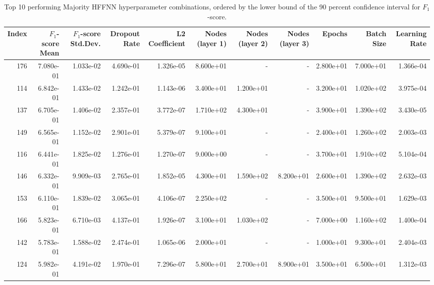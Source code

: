 \begin{table}
\caption{Top 10 performing Majority HFFNN hyperparameter combinations, ordered by the lower bound of the 90 percent confidence interval for $F_1$-score.}
\label{tab:05_best_majority_hffnn_hpars}
\begin{tabular}{rrrrrrrrrrr}
\toprule
Index & $F_1$-score Mean & $F_1$-score Std.Dev. & Dropout Rate & L2 Coefficient & Nodes (layer 1) & Nodes (layer 2) & Nodes (layer 3) & Epochs & Batch Size & Learning Rate \\
\midrule
176 & 7.080e-01 & 1.033e-02 & 4.690e-01 & 1.326e-05 & 8.600e+01 & - & - & 2.800e+01 & 7.000e+01 & 1.366e-04 \\
114 & 6.842e-01 & 1.433e-02 & 1.242e-01 & 1.143e-06 & 3.400e+01 & 1.200e+01 & - & 3.200e+01 & 1.020e+02 & 3.975e-04 \\
137 & 6.705e-01 & 1.406e-02 & 2.357e-01 & 3.772e-07 & 1.710e+02 & 4.300e+01 & - & 3.900e+01 & 1.390e+02 & 3.430e-05 \\
149 & 6.565e-01 & 1.152e-02 & 2.901e-01 & 5.379e-07 & 9.100e+01 & - & - & 2.400e+01 & 1.260e+02 & 2.003e-03 \\
116 & 6.441e-01 & 1.825e-02 & 1.276e-01 & 1.270e-07 & 9.000e+00 & - & - & 3.700e+01 & 1.910e+02 & 5.104e-04 \\
146 & 6.332e-01 & 9.909e-03 & 2.765e-01 & 1.852e-05 & 4.300e+01 & 1.590e+02 & 8.200e+01 & 2.600e+01 & 1.390e+02 & 2.632e-03 \\
153 & 6.110e-01 & 1.839e-02 & 3.065e-01 & 4.106e-07 & 2.250e+02 & - & - & 3.500e+01 & 9.500e+01 & 1.629e-03 \\
166 & 5.823e-01 & 6.710e-03 & 4.137e-01 & 1.926e-07 & 3.100e+01 & 1.030e+02 & - & 7.000e+00 & 1.160e+02 & 1.400e-04 \\
142 & 5.783e-01 & 1.588e-02 & 2.474e-01 & 1.065e-06 & 2.000e+01 & - & - & 1.000e+01 & 9.300e+01 & 2.404e-03 \\
124 & 5.982e-01 & 4.191e-02 & 1.970e-01 & 7.296e-07 & 5.800e+01 & 2.700e+01 & 8.900e+01 & 3.500e+01 & 6.500e+01 & 1.312e-03 \\
\bottomrule
\end{tabular}
\end{table}
